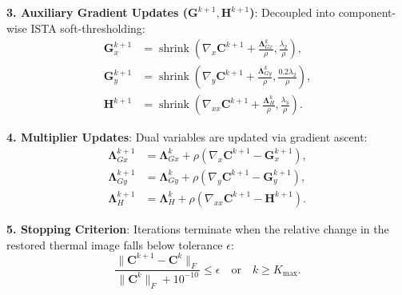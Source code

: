 \textbf{3. Auxiliary Gradient Updates ($\mathbf{G}^{k+1}, \mathbf{H}^{k+1}$)}: Decoupled into component-wise ISTA soft-thresholding:
\begin{align}
\mathbf{G}_x^{k+1} &= \operatorname{shrink}\left(\nabla_x \mathbf{C}^{k+1} + \frac{\mathbf{\Lambda}_{Gx}^k}{\rho}, \frac{\lambda_2}{\rho}\right), \label{eq:gx_update} \\
\mathbf{G}_y^{k+1} &= \operatorname{shrink}\left(\nabla_y \mathbf{C}^{k+1} + \frac{\mathbf{\Lambda}_{Gy}^k}{\rho}, \frac{0.2 \lambda_2}{\rho}\right), \label{eq:gy_update} \\
\mathbf{H}^{k+1} &= \operatorname{shrink}\left(\nabla_{xx} \mathbf{C}^{k+1} + \frac{\mathbf{\Lambda}_H^k}{\rho}, \frac{\lambda_3}{\rho}\right). \label{eq:h_update}
\end{align}

\textbf{4. Multiplier Updates}: Dual variables are updated via gradient ascent:
\begin{align}
\mathbf{\Lambda}_{Gx}^{k+1} &= \mathbf{\Lambda}_{Gx}^k + \rho (\nabla_x \mathbf{C}^{k+1} - \mathbf{G}_x^{k+1}), \\
\mathbf{\Lambda}_{Gy}^{k+1} &= \mathbf{\Lambda}_{Gy}^k + \rho (\nabla_y \mathbf{C}^{k+1} - \mathbf{G}_y^{k+1}), \\
\mathbf{\Lambda}_H^{k+1} &= \mathbf{\Lambda}_H^k + \rho (\nabla_{xx} \mathbf{C}^{k+1} - \mathbf{H}^{k+1}).
\end{align}

\textbf{5. Stopping Criterion}: Iterations terminate when the relative change in the restored thermal image falls below tolerance $\epsilon$:
\begin{equation}
\label{eq:stopping_criterion}
\frac{\|\mathbf{C}^{k+1} - \mathbf{C}^k\|_F}{\|\mathbf{C}^k\|_F + 10^{-10}} \le \epsilon \quad \text{or} \quad k \ge K_{\max}.
\end{equation}

